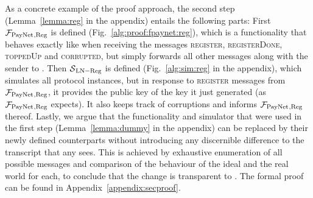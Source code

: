   As a concrete example of the proof approach, the second step (Lemma~\ref{lemma:reg} in the appendix) entails the following parts: First
  $\mathcal{F}_{\mathrm{PayNet}}{}_{\mathrm{, Reg}}$ is defined (Fig.~\ref{alg:proof:fpaynet:reg}),
  which is a functionality that behaves exactly like \fpaynet{} when receiving
  the messages \textsc{register}, \textsc{registerDone}, \textsc{toppedUp} and
  \textsc{corrupted}, but simply forwards all other messages along with the
  sender to \simulator. Then $\mathcal{S}{}_{\mathrm{LN - Reg}}$ is defined
  (Fig.~\ref{alg:sim:reg} in the appendix), which simulates all protocol instances, but in
  response to \textsc{register} messages from $\mathcal{F}_{\mathrm{PayNet}}{}_{\mathrm{, Reg}}$, it
  provides the public key of the key it just generated (as
  $\mathcal{F}_{\mathrm{PayNet}}{}_{\mathrm{, Reg}}$ expects). It also keeps track of corruptions and
  informs $\mathcal{F}_{\mathrm{PayNet}}{}_{\mathrm{, Reg}}$ thereof. Lastly, we argue that the
  functionality and simulator that were used in  the first step (Lemma~\ref{lemma:dummy} in the appendix) can be
  replaced by their newly defined counterparts without introducing any
  discernible difference to the transcript that any \environment{} sees. This is
  achieved by exhaustive enumeration of all possible messages and comparison of
  the behaviour of the ideal and the real world for each, to conclude that the
  change is transparent to \environment.
  The formal proof can be found in Appendix~\ref{appendix:secproof}.
